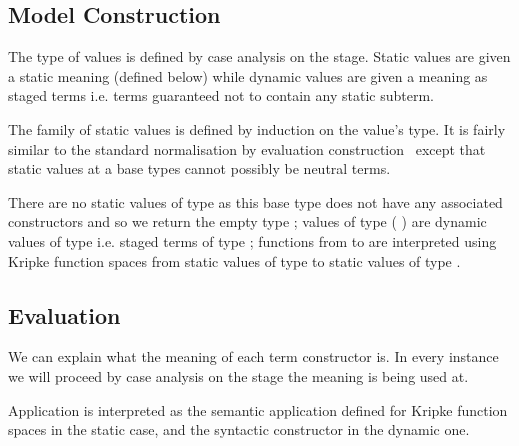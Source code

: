 \documentclass{article}
\begin{document}
\subsection{Model Construction}\label{sec:stagingmodel}

The type of values is defined by case analysis on the stage.
%
Static values are given a static meaning (defined below)
while dynamic values are given a meaning as staged terms
i.e. terms guaranteed not to contain any static subterm.


The family of static values is defined by induction on
the value's type. It is fairly similar to the standard
normalisation by evaluation
construction~\cite{DBLP:conf/lics/BergerS91,DBLP:journals/mscs/CoquandD97,DBLP:journals/lisp/Coquand02}
except that static values at a base types cannot possibly
be neutral terms.

\begin{AgdaSuppressSpace}
\end{AgdaSuppressSpace}

There are no static values of type  as this base type does
not have any associated constructors and so we return the empty type ;
values of type ( ) are dynamic values of type 
i.e. staged terms of type ;
functions from  to  are interpreted using Kripke function
spaces from static values of type  to static values of type .






\subsection{Evaluation}

We can explain what the meaning of each term constructor is.
In every instance we will proceed by case analysis on the
stage the meaning is being used at.


Application is interpreted as the semantic application defined
for Kripke function spaces in the static case, and the syntactic
 constructor in the dynamic one.
\end{document}
